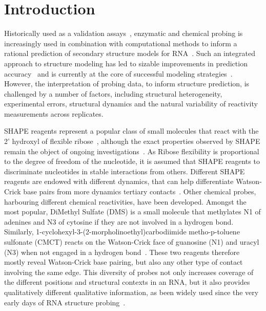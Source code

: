 \documentclass[a4,center,fleqn]{NAR}
\begin{document}


\section*{Introduction}


Historically used as a validation assays~\cite{Knapp1989}, enzymatic and chemical probing  is increasingly used in combination with computational methods to inform a rational prediction of secondary structure models for RNA~\cite{Mathews2004}. Such an integrated approach to structure modeling has led to sizable improvements in prediction accuracy~\cite{Washietl2012} and is currently at the core of successful modeling strategies~\cite{Miao2017}. However, the interpretation of probing data, to inform structure prediction, is challenged by a number of factors, including structural heterogeneity, experimental errors, structural dynamics and the natural variability of reactivity measurements across replicates. 

SHAPE reagents represent a popular class of small molecules that react with the 2’ hydroxyl of flexible ribose~\cite{McGinnis2012}, although the exact properties observed by SHAPE remain the object of ongoing investigations~\cite{McGinnis2012,Hurst2018,Mlynsky2018,Frezza2019,Busan2019}.
As Ribose flexibility is proportional to the degree of freedom of the nucleotide, it is assumed that SHAPE reagents to discriminate nucleotides in stable interactions from others. Different SHAPE reagents are endowed with different dynamics, that can help differentiate Watson-Crick base pairs from more dynamics tertiary contacts~\cite{Gherghe2008,Steen2012,Rice2014,Busan2019}. Other chemical probes, harbouring different chemical reactivities, have been developed. Amongst the most popular, DiMethyl Sulfate (DMS) is a small molecule that methylates N1 of adenines and N3 of cytosine if they are not involved in a hydrogen bond. Similarly, 1-cyclohexyl-3-(2-morpholinoethyl)carbodiimide metho-p-toluene sulfonate (CMCT) reacts on the Watson-Crick face of guanosine (N1) and uracyl (N3) when not engaged in a hydrogen bond~\cite{Ehresmann1987,Brunel2000}. These two reagents therefore mostly reveal Watson-Crick base pairing, but also any other type of contact involving the same edge. This diversity of probes not only increases  coverage of the different positions and structural contexts in an RNA, but it also provides qualitatively different qualitative information, as been widely used since the very early days of RNA structure probing~\cite{Moazed1986, Ehresmann1987, Romaniuk1988, Butcher1994, Brunel2000,  Cordero2015, Somarowthu2015, Gross2017}. 
\end{document}
